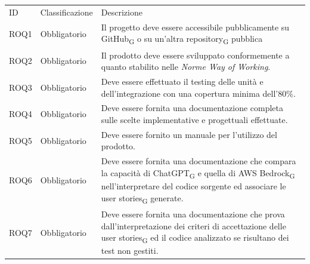 \documentclass{article}
\begin{document}
\begin{center}
    \begin{tabular}{|p{3cm}|p{3cm}|p{6cm}|}
    \rowcolor{Blue} 
\hline
ID & Classificazione & Descrizione\\ 
\rowcolor{LightBlue}
\hline
ROQ1& Obbligatorio & Il progetto deve essere accessibile pubblicamente su GitHub\textsubscript{G} o su un'altra repository\textsubscript{G} pubblica\\ 
\rowcolor{LighterBlue}
\hline
ROQ2& Obbligatorio & Il prodotto deve essere sviluppato conformemente a quanto stabilito nelle \textit{Norme Way of Working}. \\ 
\rowcolor{LightBlue}
\hline
ROQ3& Obbligatorio & Deve essere effettuato il testing delle unità e dell'integrazione con una copertura minima dell'80\%.\\
\hline
\rowcolor{LighterBlue}

ROQ4& Obbligatorio & Deve essere fornita una documentazione completa sulle scelte implementative e progettuali effettuate.\\
\hline
\rowcolor{LightBlue}
ROQ5& Obbligatorio & Deve essere fornito un manuale per l'utilizzo del prodotto.\\
\hline
\rowcolor{LighterBlue}
ROQ6& Obbligatorio & Deve essere fornita una documentazione che compara la capacità di ChatGPT\textsubscript{G} e quella di AWS Bedrock\textsubscript{G} nell'interpretare del codice sorgente ed associare le user stories\textsubscript{G} generate.\\
\hline
\rowcolor{LightBlue}
ROQ7& Obbligatorio & Deve essere fornita una documentazione che prova dall'interpretazione dei criteri di accettazione delle user stories\textsubscript{G} ed il codice analizzato se risultano dei test non gestiti.\\
\hline
\end{tabular}
\label{tab:reqal}
\end{center}
\newpage
\end{document}
